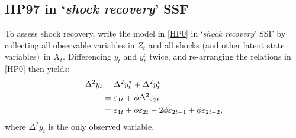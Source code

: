 \documentclass[a4paper,final,12pt]{article}
\begin{document}
\subsection{HP97 in `\emph{shock recovery}' SSF}

To assess shock recovery, write the model in \ref{HP0} in `\emph{shock
recovery}' SSF by collecting all observable variables in $Z_{t}$ and all
shocks (and other latent state variables)\ in $X_{t}$. Differencing $y_{t}$
and $y_{t}^{c}$ twice, and re-arranging the relations in \ref{HP0} then
yields:%
\begin{align}
\Delta ^{2}y_{t}& =\Delta ^{2}y_{t}^{\ast }+\Delta ^{2}y_{t}^{c}  \notag \\
& =\varepsilon _{1t}+\phi \Delta ^{2}\varepsilon _{2t}  \notag \\
& =\varepsilon _{1t}+\phi \varepsilon _{2t}-2\phi \varepsilon _{2t-1}+\phi
\varepsilon _{2t-2},  \label{Z}
\end{align}%
where $\Delta ^{2}y_{t}$ is the only observed variable.
\end{document}
